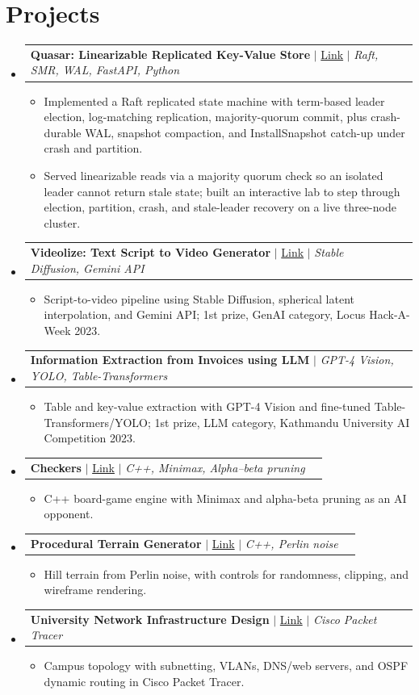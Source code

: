 \documentclass[letterpaper,11pt]{article}
\makeatletter
\newcommand{\resumeItem}[1]{
  \item\small{
    {#1 \vspace{-2pt}}
  }
}
\newcommand{\resumeProjectHeading}[2]{
    \item
    \begin{tabular*}{0.97\textwidth}{l@{\extracolsep{\fill}}r}
      \small#1 & #2 \\
    \end{tabular*}\vspace{-7pt}
}
\newcommand{\resumeSubHeadingListStart}{\begin{itemize}[leftmargin=0.15in, label={}]}
\newcommand{\resumeSubHeadingListEnd}{\end{itemize}}
\newcommand{\resumeItemListStart}{\begin{itemize}}
\newcommand{\resumeItemListEnd}{\end{itemize}\vspace{-5pt}}
\makeatother
\begin{document}
\section{Projects}
    \resumeSubHeadingListStart
      \resumeProjectHeading
          {\textbf{Quasar: Linearizable Replicated Key-Value Store} $|$ \href{https://github.com/avisekksarma/nebula/tree/main/projects/quasar}{Link} $|$ \emph{Raft, SMR, WAL, FastAPI, Python}}{}
          \resumeItemListStart
            \resumeItem{Implemented a Raft replicated state machine with term-based leader election, log-matching replication, majority-quorum commit, plus crash-durable WAL, snapshot compaction, and InstallSnapshot catch-up under crash and partition.}
            \resumeItem{Served linearizable reads via a majority quorum check so an isolated leader cannot return stale state; built an interactive lab to step through election, partition, crash, and stale-leader recovery on a live three-node cluster.}
          \resumeItemListEnd
      \resumeProjectHeading
          {\textbf{Videolize: Text Script to Video Generator} $|$ \href{https://github.com/avisekksarma/slerp-diffusion}{Link} $|$ \emph{Stable Diffusion, Gemini API}}{}
          \resumeItemListStart
            \resumeItem{Script-to-video pipeline using Stable Diffusion, spherical latent interpolation, and Gemini API; 1st prize, GenAI category, Locus Hack-A-Week 2023.}
          \resumeItemListEnd
      \resumeProjectHeading
          {\textbf{Information Extraction from Invoices using LLM} $|$ \emph{GPT-4 Vision, YOLO, Table-Transformers}}{}
          \resumeItemListStart
            \resumeItem{Table and key-value extraction with GPT-4 Vision and fine-tuned Table-Transformers/YOLO; 1st prize, LLM category, Kathmandu University AI Competition 2023.}
          \resumeItemListEnd
      \resumeProjectHeading
          {\textbf{Checkers} $|$ \href{https://github.com/avisekksarma/BoardGames}{Link} $|$ \emph{C++, Minimax, Alpha--beta pruning}}{}
          \resumeItemListStart
            \resumeItem{C++ board-game engine with Minimax and alpha-beta pruning as an AI opponent.}
          \resumeItemListEnd
      \resumeProjectHeading
          {\textbf{Procedural Terrain Generator} $|$ \href{https://github.com/avisekksarma/Procedural-Terrain-Generator}{Link} $|$ \emph{C++, Perlin noise}}{}
          \resumeItemListStart
            \resumeItem{Hill terrain from Perlin noise, with controls for randomness, clipping, and wireframe rendering.}
          \resumeItemListEnd
      \resumeProjectHeading
          {\textbf{University Network Infrastructure Design} $|$ \href{https://github.com/avisekksarma/Computer-Network-Project}{Link} $|$ \emph{Cisco Packet Tracer}}{}
          \resumeItemListStart
            \resumeItem{Campus topology with subnetting, VLANs, DNS/web servers, and OSPF dynamic routing in Cisco Packet Tracer.}
          \resumeItemListEnd
    \resumeSubHeadingListEnd
\end{document}
